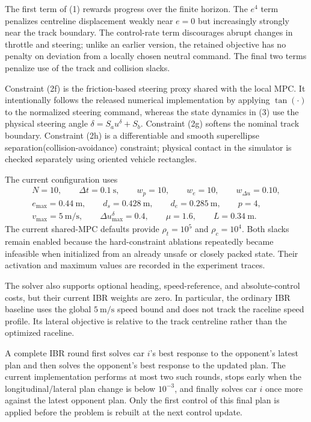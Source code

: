 \documentclass[11pt]{article}
\begin{document}
The first term of (1) rewards progress over the finite horizon. The $e^4$ term
penalizes centreline displacement weakly near $e=0$ but increasingly strongly
near the track boundary. The control-rate term discourages abrupt changes in
throttle and steering; unlike an earlier version, the retained objective has no
penalty on deviation from a locally chosen neutral command. The final two terms
penalize use of the track and collision slacks.

Constraint (2f) is the friction-based steering proxy shared with the local MPC.
It intentionally follows the released numerical implementation by applying
$\tan(\cdot)$ to the normalized steering command, whereas the state dynamics in
(3) use the physical steering angle
$\delta=S_a u^\delta+S_b$. Constraint (2g) softens the nominal track boundary.
Constraint (2h) is a differentiable and smooth superellipse separation(collision-avoidance) constraint;
physical contact in the simulator is checked separately using oriented vehicle
rectangles.

The current configuration uses
\[
\begin{gathered}
N=10,\qquad \Delta t=0.1~\mathrm{s},\qquad
w_p=10,\qquad w_e=10,\qquad w_{\Delta u}=0.10,\\
e_{\max}=0.44~\mathrm{m},\qquad
d_s=0.428~\mathrm{m},\qquad
d_e=0.285~\mathrm{m},\qquad p=4,\\
v_{\max}=5~\mathrm{m/s},\qquad
\Delta u_{\max}^{\delta}=0.4,\qquad
\mu=1.6,\qquad L=0.34~\mathrm{m}.
\end{gathered}
\]
The current shared-MPC defaults provide
$\rho_t=10^5$ and $\rho_c=10^4$. Both slacks remain enabled because the
hard-constraint ablations repeatedly became infeasible when initialized from
an already unsafe or closely packed state. Their activation and maximum values
are recorded in the experiment traces.

The solver also supports optional heading, speed-reference, and absolute-control
costs, but their current IBR weights are zero. In particular, the ordinary IBR
baseline uses the global $5~\mathrm{m/s}$ speed bound and does not track the
raceline speed profile. Its lateral objective is relative to the track
centreline rather than the optimized raceline.

A complete IBR round first solves car $i$'s best response to the opponent's
latest plan and then solves the opponent's best response to the updated plan.
The current implementation performs at most two such rounds, stops early when
the longitudinal/lateral plan change is below $10^{-3}$, and finally solves car
$i$ once more against the latest opponent plan. Only the first control of this
final plan is applied before the problem is rebuilt at the next control update.
\end{document}

